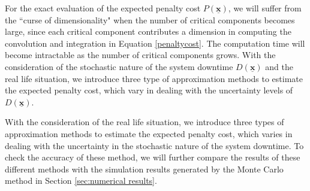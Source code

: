 \documentclass[preprint,12pt]{elsarticle}
\begin{document}
For the exact evaluation of the expected penalty cost $P(\boldsymbol{\underline{x}})$, we will suffer from the ``curse of dimensionality" when the number of critical components becomes large, since each critical component contributes a dimension in computing the convolution and integration in Equation \eqref{penaltycost}. The computation time will become intractable as the number of critical components grows. With the consideration of the stochastic nature of the system downtime $D(\boldsymbol{\underline{x}})$ and the real life situation, we introduce three type of approximation methods to estimate the expected penalty cost, which vary in dealing with the uncertainty levels of $D(\boldsymbol{\underline{x}})$.


  With the consideration of the real life situation, we introduce three types of approximation methods to estimate the expected penalty cost, which varies in dealing with the uncertainty in the stochastic nature of the system downtime. To check the accuracy of these method, we will further compare the results of these different methods with the simulation results generated by the Monte Carlo method in Section \ref{sec:numerical results}.
\end{document}
